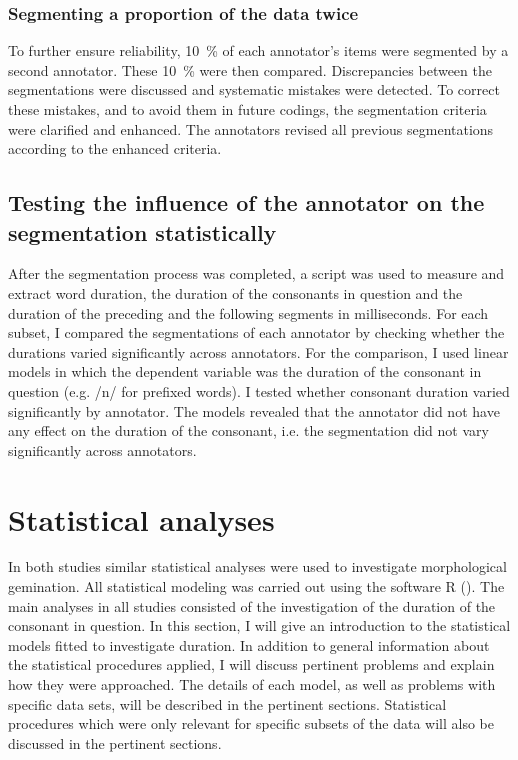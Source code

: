\subsubsection{Segmenting a proportion of the data twice}

To further ensure reliability, 10~\% of each annotator's items were segmented by a second annotator. These 10~\% were then compared. Discrepancies between the segmentations were discussed and systematic mistakes were detected. To correct these mistakes, and to avoid them in future codings, the segmentation criteria were clarified and enhanced. The annotators revised all previous segmentations according to the enhanced criteria.


\subsection{Testing the influence of the annotator on the segmentation statistically}

After the segmentation process was completed, a script was used to measure and extract word duration, the duration of the consonants in question and the duration of the preceding and the following segments in milliseconds. For each subset,  I compared the segmentations of each annotator by checking whether the durations varied significantly across annotators.
 For the comparison, I used linear models in which the dependent variable was the duration of the consonant in question (e.g. /n/ for prefixed words). I tested whether consonant duration varied significantly by annotator. The models revealed that the annotator did not have any effect on the duration of the consonant, i.e. the segmentation did not vary significantly across annotators.


\section{Statistical analyses}\label{stats}

In both studies similar statistical analyses were used to investigate {morphological gemination}. All statistical modeling was carried out using the software R (\citealt{RDevelopmentCoreTeam.2014}). 
The main analyses in all studies consisted of the investigation of the duration of the consonant in question. 
In this section, I will give an introduction to the statistical models fitted to investigate duration. In addition to general information about the statistical procedures applied, I will discuss pertinent problems and explain how they were approached. The details of each model, as well as problems with specific data sets, will be described in the pertinent sections. Statistical procedures which were only relevant for specific subsets of the data will also be discussed in the pertinent sections. 




